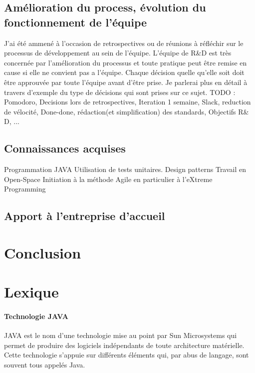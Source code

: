 \subsection{Amélioration du process, évolution du fonctionnement de l'équipe}
J'ai été ammené à l'occasion de retrospectives ou de réunions à réfléchir sur le processus de développement au sein de l'équipe. L'équipe de R\&D est très concernée par l'amélioration du processus et toute pratique peut être remise en cause si elle ne convient pas a l'équipe. Chaque décision quelle qu'elle soit doit être approuvée par toute l'équipe avant d'être prise. Je parlerai plus en détail à travers d'exemple du type de décisions qui sont prises sur ce sujet.
TODO : Pomodoro, Decisions lors de retrospectives, Iteration 1 semaine, Slack, reduction de vélocité, Done-done, rédaction(et simplification) des standards, Objectifs R\& D, ...

\subsection{Connaissances acquises}
Programmation JAVA
Utilisation de tests unitaires.
Design patterns
Travail en Open-Space
Initiation à la méthode Agile en particulier à l'eXtreme Programming

\subsection{Apport à l'entreprise d'accueil}

\section{Conclusion}

\section{Lexique}
\paragraph{Technologie JAVA}
JAVA est le nom d'une technologie mise au point par Sun Microsystems qui permet de produire des logiciels indépendants de toute architecture matérielle. Cette technologie s'appuie sur différents éléments qui, par abus de langage, sont souvent tous appelés Java.
